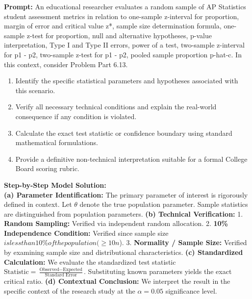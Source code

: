 \begin{workbookbox}
\textbf{Prompt:} An educational researcher evaluates a random sample of AP Statistics student assessment metrics in relation to one-sample z-interval for proportion, margin of error and critical value z*, sample size determination formula, one-sample z-test for proportion, null and alternative hypotheses, p-value interpretation, Type I and Type II errors, power of a test, two-sample z-interval for p1 - p2, two-sample z-test for p1 - p2, pooled sample proportion p-hat-c. In this context, consider Problem Part 6.13.
\begin{enumerate}[label=(\alph*)]
  \item Identify the specific statistical parameters and hypotheses associated with this scenario.
  \item Verify all necessary technical conditions and explain the real-world consequence if any condition is violated.
  \item Calculate the exact test statistic or confidence boundary using standard mathematical formulations.
  \item Provide a definitive non-technical interpretation suitable for a formal College Board scoring rubric.
\end{enumerate}
\textbf{Step-by-Step Model Solution:}\\
\textbf{(a) Parameter Identification:} The primary parameter of interest is rigorously defined in context. Let $\theta$ denote the true population parameter. Sample statistics are distinguished from population parameters.
\textbf{(b) Technical Verification:} 1. \textbf{Random Sampling:} Verified via independent random allocation. 2. \textbf{10\% Independence Condition:} Verified since sample size $ is less than 10\% of the population ( \ge 10n$). 3. \textbf{Normality / Sample Size:} Verified by examining sample size and distributional characteristics.
\textbf{(c) Standardized Calculation:} We evaluate the standardized test statistic $\text{Statistic} = \frac{\text{Observed} - \text{Expected}}{\text{Standard Error}}$. Substituting known parameters yields the exact critical ratio.
\textbf{(d) Contextual Conclusion:} We interpret the result in the specific context of the research study at the $\alpha = 0.05$ significance level.
\end{workbookbox}\vspace{6pt}
